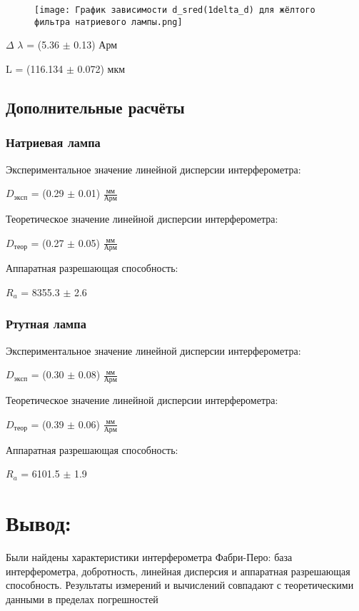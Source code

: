\documentclass[a4paper, 12pt]{article}
\begin{document}
\begin{figure}[h]
 \centering
\texttt{[image: График зависимости d\_sred(1delta\_d) для жёлтого фильтра натриевого лампы.png]}
\end{figure}

\par
$\Delta$ $\lambda$ = (5.36 $\pm$ 0.13) Арм
\par
L = (116.134 $\pm$ 0.072) мкм


\subsection{Дополнительные расчёты}
\subsubsection{Натриевая лампа}
Экспериментальное значение линейной дисперсии интерферометра:
\par
$D_{эксп}$ = (0.29 $\pm$ 0.01) $\frac{мм}{Арм}$
\par
Теоретическое значение линейной дисперсии интерферометра:
\par
$D_{теор}$ = (0.27 $\pm$ 0.05) $\frac{мм}{Арм}$
\par
Аппаратная разрешающая способность:
\par
$R_{a}$ = 8355.3 $\pm$ 2.6


\subsubsection{Ртутная лампа}
Экспериментальное значение линейной дисперсии интерферометра:
\par
$D_{эксп}$ = (0.30 $\pm$ 0.08) $\frac{мм}{Арм}$
\par
Теоретическое значение линейной дисперсии интерферометра:
\par
$D_{теор}$ = (0.39 $\pm$ 0.06) $\frac{мм}{Арм}$
\par
Аппаратная разрешающая способность:
\par
$R_{a}$ = 6101.5 $\pm$ 1.9


\large\section{Вывод:}
Были найдены характеристики интерферометра Фабри-Перо: база интерферометра, добротность, линейная дисперсия и аппаратная разрешающая способность. Результаты измерений и вычислений совпадают с теоретическими данными в пределах погрешностей
\end{document}

